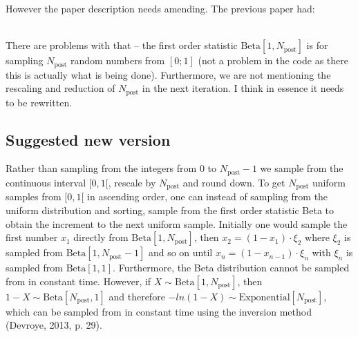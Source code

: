 \documentclass{article}
\begin{document}
However the paper description needs amending. The previous paper had:

\\[0.3cm]

There are problems with that -- the first order statistic
$\text{Beta}[1,N_{\text{post}}]$ is for sampling $N_{\text{post}}$
random numbers from $[0;1]$ (not a problem in the code as there this
is actually what is being done). Furthermore, we are not mentioning
the rescaling and reduction of $N_{\text{post}}$ in the next
iteration. I think in  essence it needs to be rewritten.

\subsection{Suggested new version}
Rather than sampling from the integers from $0$ to $N_{\text{post}}-1$
we sample from the continuous interval $[0,1[$, rescale by
    $N_{\text{post}}$ and round down. To get $N_{\text{post}}$ uniform
    samples from $[0,1[$ in ascending order, one can instead of
        sampling from the uniform distribution and sorting, sample
        from the first order statistic Beta to obtain the increment to
        the next uniform sample. Initially one would sample the first
        number $x_1$ directly from $\text{Beta}[1,N_{\text{post}}]$, then
        $x_2= (1- x_1) \cdot \xi_2$ where $\xi_2$ is sampled from
        $\text{Beta}[1,N_{\text{post}}-1]$ and so on until $x_n=
        (1-x_{n-1}) \cdot \xi_n$ with  $\xi_n$ is sampled from $\text{Beta}[1,1]$.
   Furthermore, the Beta distribution cannot be sampled from
in constant time. However, if $X \sim \text{Beta}[1,N_{\text{post}}]$, then
$1 - X \sim \text{Beta}[N_{\text{post}}, 1]$ and therefore $−ln(1 - X)
\sim \text{Exponential}[N_{\text{post}}]$, which can be sampled from
in constant time using the inversion method (Devroye, 2013, p. 29).
\end{document}
